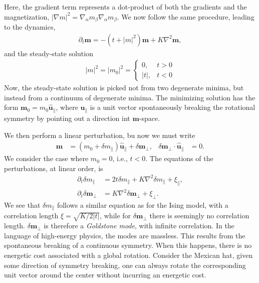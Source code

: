 Here, the gradient term represents a dot-product of both the gradients and the magnetization, $|\nabla m|^2 = \nabla_\alpha m_\beta \nabla_\alpha m_\beta$.
We now follow the same procedure, leading to the dynamics,
%
\begin{align}
    \partial_t \bm m = - (t + |m|^2) \bm m + K \nabla^2 \bm m,
\end{align}
%
and the steady-state solution
%
\begin{align}
    |m|^2 = 
    |m_0|^2 
    =
    \begin{cases}
        0, & t > 0 \\
        |t|, & t < 0 
    \end{cases}
\end{align}
%
Now, the steady-state solution is picked not from two degenerate minima, but instead from a continuum of degenerate minima.
The minimizing solution has the form $\bm m_0 = m_0 \hat {\bm u}_\parallel$, where $\hat {\bm u}_\parallel$ is a unit vector spontaneously breaking the rotational symmetry by pointing out a direction int $\bm m$-space.

We then perform a linear perturbation, bu now we must write
%
\begin{align}
    \bm m &= (m_0 + \delta m_\parallel) \hat {\bm u}_\parallel + \delta \bm m_\perp, &
    \delta \bm m_\perp \cdot \hat {\bm u}_\parallel &= 0.
\end{align}
%
We consider the case where $m_0 = 0$, i.e., $t < 0$.
The equations of the perturbations, at linear order, is
%
\begin{align}
    \partial_t \delta m_\parallel 
    & = 
    2 t \delta m_\parallel + K \nabla^2 \delta m_\parallel + \xi_\parallel, \\
    \partial_t \delta \bm m_\perp
    & = K \nabla^2 \delta \bm m_\perp + \xi_\perp.
\end{align}
%
We see that $\delta m_\parallel$ follows a similar equation as for the Ising model, with a correlation length $\xi = \sqrt{ K / 2 |t| }$, while for $\delta \bm m_\perp$ there is seemingly no correlation length.
$\delta \bm m_\perp$ is therefore a \emph{Goldstone mode}, with infinite correlation.
In the language of high-energy physics, the modes are massless.
This results from the spontaneous breaking of a continuous symmetry.
When this happens, there is no energetic cost associated with a global rotation.
Consider the Mexican hat, given some direction of symmetry breaking, one can always rotate the corresponding unit vector around the center without incurring an energetic cost.

